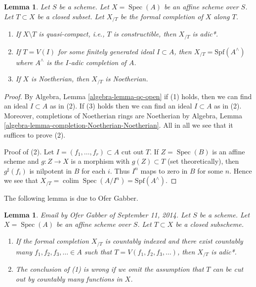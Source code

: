 \documentclass{stacks-project}
\newenvironment{reference}{\comment}{\endcomment}
\theoremstyle{plain}
\newtheorem{lemma}[subsection]{Lemma}
\theoremstyle{definition}
\theoremstyle{remark}
\numberwithin{equation}{subsection}
\def\colim{\mathop{\mathrm{colim}}\nolimits}
\def\Spec{\mathop{\mathrm{Spec}}}
\begin{document}
\begin{lemma}
\label{lemma-affine-formal-completion-types}
Let $S$ be a scheme. Let $X = \Spec(A)$ be an affine scheme over $S$.
Let $T \subset X$ be a closed subset. Let $X_{/T}$ be the
formal completion of $X$ along $T$.
\begin{enumerate}
\item If $X \setminus T$ is quasi-compact, i.e., $T$ is constructible,
then $X_{/T}$ is adic*.
\item If $T = V(I)$ for some finitely generated ideal $I \subset A$,
then $X_{/T} = \text{Spf}(A^\wedge)$ where $A^\wedge$ is the
$I$-adic completion of $A$.
\item If $X$ is Noetherian, then $X_{/T}$ is Noetherian.
\end{enumerate}
\end{lemma}

\begin{proof}
By Algebra, Lemma \ref{algebra-lemma-qc-open} if (1) holds, then
we can find an ideal $I \subset A$ as in (2). If (3) holds then
we can find an ideal $I \subset A$ as in (2). Moreover, completions
of Noetherian rings are Noetherian by
Algebra, Lemma \ref{algebra-lemma-completion-Noetherian-Noetherian}.
All in all we see that it suffices to prove (2).

\medskip\noindent
Proof of (2).
Let $I = (f_1, \ldots, f_r) \subset A$ cut out $T$.
If $Z = \Spec(B)$ is an affine scheme and $g : Z \to X$ is
a morphism with $g(Z) \subset T$ (set theoretically), then
$g^\sharp(f_i)$ is nilpotent in $B$ for each $i$. Thus
$I^n$ maps to zero in $B$ for some $n$. Hence we see that
$X_{/T} = \colim \Spec(A/I^n) = \text{Spf}(A^\wedge)$.
\end{proof}

\noindent
The following lemma is due to Ofer Gabber.

\begin{lemma}
\label{lemma-completion-countably-indexed}
\begin{reference}
Email by Ofer Gabber of September 11, 2014.
\end{reference}
Let $S$ be a scheme. Let $X = \Spec(A)$ be an affine scheme over $S$.
Let $T \subset X$ be a closed subscheme.
\begin{enumerate}
\item If the formal completion $X_{/T}$ is countably indexed
and there exist countably many $f_1, f_2, f_3, \ldots \in A$ such that
$T = V(f_1, f_2, f_3, \ldots)$, then $X_{/T}$ is adic*.
\item The conclusion of (1) is wrong if we omit the assumption that
$T$ can be cut out by countably many functions in $X$.
\end{enumerate}
\end{lemma}
\end{document}

